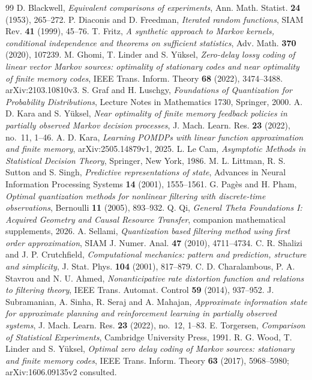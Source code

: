 \begin{thebibliography}{99}
 D. Blackwell, \emph{Equivalent comparisons of experiments}, Ann. Math. Statist. \textbf{24} (1953), 265--272.
 P. Diaconis and D. Freedman, \emph{Iterated random functions}, SIAM Rev. \textbf{41} (1999), 45--76.
 T. Fritz, \emph{A synthetic approach to Markov kernels, conditional independence and theorems on sufficient statistics}, Adv. Math. \textbf{370} (2020), 107239.
 M. Ghomi, T. Linder and S. Y\"uksel, \emph{Zero-delay lossy coding of linear vector Markov sources: optimality of stationary codes and near optimality of finite memory codes}, IEEE Trans. Inform. Theory \textbf{68} (2022), 3474--3488. arXiv:2103.10810v3.
 S. Graf and H. Luschgy, \emph{Foundations of Quantization for Probability Distributions}, Lecture Notes in Mathematics 1730, Springer, 2000.
 A. D. Kara and S. Y\"uksel, \emph{Near optimality of finite memory feedback policies in partially observed Markov decision processes}, J. Mach. Learn. Res. \textbf{23} (2022), no.~11, 1--46.
 A. D. Kara, \emph{Learning POMDPs with linear function approximation and finite memory}, arXiv:2505.14879v1, 2025.
 L. Le Cam, \emph{Asymptotic Methods in Statistical Decision Theory}, Springer, New York, 1986.
 M. L. Littman, R. S. Sutton and S. Singh, \emph{Predictive representations of state}, Advances in Neural Information Processing Systems \textbf{14} (2001), 1555--1561.
 G. Pag\`es and H. Pham, \emph{Optimal quantization methods for nonlinear filtering with discrete-time observations}, Bernoulli \textbf{11} (2005), 893--932.
 Q. Qi, \emph{General Theta Foundations I: Acquired Geometry and Causal Resource Transfer}, companion mathematical supplements, 2026.
 A. Sellami, \emph{Quantization based filtering method using first order approximation}, SIAM J. Numer. Anal. \textbf{47} (2010), 4711--4734.
 C. R. Shalizi and J. P. Crutchfield, \emph{Computational mechanics: pattern and prediction, structure and simplicity}, J. Stat. Phys. \textbf{104} (2001), 817--879.
 C. D. Charalambous, P. A. Stavrou and N. U. Ahmed, \emph{Nonanticipative rate distortion function and relations to filtering theory}, IEEE Trans. Automat. Control \textbf{59} (2014), 937--952.
 J. Subramanian, A. Sinha, R. Seraj and A. Mahajan, \emph{Approximate information state for approximate planning and reinforcement learning in partially observed systems}, J. Mach. Learn. Res. \textbf{23} (2022), no.~12, 1--83.
 E. Torgersen, \emph{Comparison of Statistical Experiments}, Cambridge University Press, 1991.
 R. G. Wood, T. Linder and S. Y\"uksel, \emph{Optimal zero delay coding of Markov sources: stationary and finite memory codes}, IEEE Trans. Inform. Theory \textbf{63} (2017), 5968--5980; arXiv:1606.09135v2 consulted.
\end{thebibliography}
